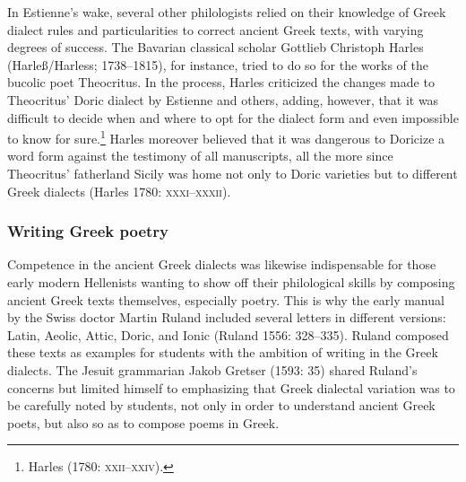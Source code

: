 \begin{styleStandard}
In Estienne’s wake, several other philologists relied on their knowledge of Greek dialect rules and particularities to correct ancient Greek texts, with varying degrees of success. The Bavarian classical scholar Gottlieb Christoph Harles (Harleß/Harless; 1738–1815), for instance, tried to do so for the works of the bucolic poet Theocritus. In the process, Harles criticized the changes made to Theocritus’ Doric dialect by Estienne and others, adding, however, that it was difficult to decide when and where to opt for the dialect form and even impossible to know for sure.\footnote{ Harles (1780: \textsc{xxii–xxiv}).} Harles moreover believed that it was dangerous to Doricize a word form against the testimony of all manuscripts, all the more since Theocritus’ fatherland Sicily was home not only to Doric varieties but to different Greek dialects (Harles 1780: \textsc{xxxi–xxxii}).
\end{styleStandard}

\subsubsection{Writing Greek poetry}
\hypertarget{Toc19704823}{}\begin{styleStandard}
Competence in the ancient Greek dialects was likewise indispensable for those early modern Hellenists wanting to show off their philological skills by composing ancient Greek texts themselves, especially poetry. This is why the early manual by the Swiss doctor Martin Ruland included several letters in different versions: Latin, Aeolic, Attic, Doric, and Ionic (Ruland 1556: 328–335). Ruland composed these texts as examples for students with the ambition of writing in the Greek dialects. The Jesuit grammarian Jakob Gretser (1593: 35) shared Ruland’s concerns but limited himself to emphasizing that Greek dialectal variation was to be carefully noted by students, not only in order to understand ancient Greek poets, but also so as to compose poems in Greek.
\end{styleStandard}


